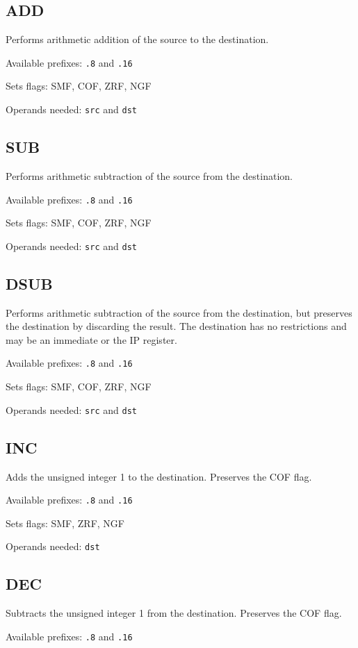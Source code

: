 \documentclass[12pt,a4paper]{report}
\begin{document}
\subsection*{ADD}
Performs arithmetic addition of the source to the destination.

Available prefixes: \texttt{.8} and \texttt{.16}

Sets flags: SMF, COF, ZRF, NGF

Operands needed: \texttt{src} and \texttt{dst}

\subsection*{SUB}
Performs arithmetic subtraction of the source from the destination.

Available prefixes: \texttt{.8} and \texttt{.16}

Sets flags: SMF, COF, ZRF, NGF

Operands needed: \texttt{src} and \texttt{dst}

\subsection*{DSUB}
Performs arithmetic subtraction of the source from the destination, but preserves the destination by discarding the result. The destination has no restrictions and may be an immediate or the IP register.

Available prefixes: \texttt{.8} and \texttt{.16}

Sets flags: SMF, COF, ZRF, NGF

Operands needed: \texttt{src} and \texttt{dst}

\subsection*{INC}
Adds the unsigned integer 1 to the destination. Preserves the COF flag.

Available prefixes: \texttt{.8} and \texttt{.16}

Sets flags: SMF, ZRF, NGF

Operands needed: \texttt{dst}

\subsection*{DEC}
Subtracts the unsigned integer 1 from the destination. Preserves the COF flag.

Available prefixes: \texttt{.8} and \texttt{.16}
\end{document}
